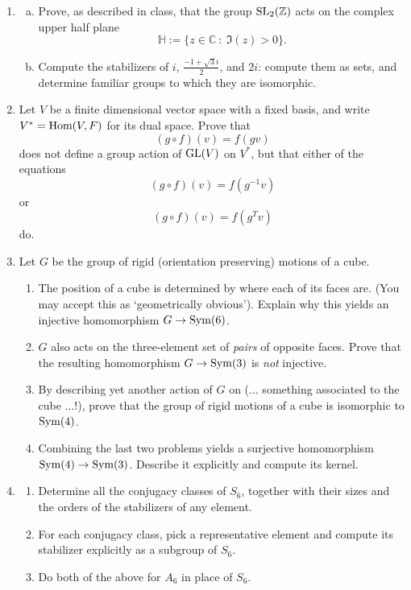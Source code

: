 \documentclass[12pt]{article}
\begin{document}
\begin{enumerate}

\item
\begin{enumerate}[(a)]
\item
Prove, as described in class, that the group $\textnormal{SL}_2(\mathbb{Z})$ acts on the complex upper half plane
\[
\mathbb{H} := \{ z \in \mathbb{C} \ : \ \Im(z) > 0 \}.
\]
\item
Compute the stabilizers of $i$, $\frac{-1 + \sqrt{3} i}{2}$, and $2i$: compute them as sets, and determine familiar groups to which they
are isomorphic. 
\end{enumerate}

\item
Let $V$ be a finite dimensional vector space with a fixed basis, and write $V^* = \textnormal{Hom}(V, F)$ for its dual space.
Prove that 
\[
(g \circ f) (v) = f (gv)
\]
does not define a group action of $\textnormal{GL}(V)$ on $V^*$, but that either of the equations
\[
(g \circ f) (v) = f (g^{-1}v)
\]
or
\[
(g \circ f) (v) = f (g^Tv)
\]
do.

\item 
Let $G$ be the group of rigid (orientation preserving) motions of a cube.
\begin{enumerate}
\item
The position of a cube is determined by where each of its faces are. (You may accept this as `geometrically obvious').
Explain why this yields an injective homomorphism $G \rightarrow \operatorname{Sym}(6)$.

\item
$G$ also acts on the three-element set of {\itshape pairs} of opposite faces. Prove that the resulting homomorphism
$G \rightarrow \operatorname{Sym}(3)$ is {\itshape not} injective.

\item By describing yet another action of $G$ on (... something associated to the cube ...!),
prove that the group of rigid motions of a cube is isomorphic to $\operatorname{Sym}(4)$. 

\item Combining the last two problems yields a surjective homomorphism $\operatorname{Sym}(4) \rightarrow \operatorname{Sym}(3)$. Describe it explicitly and 
compute its kernel.

\end{enumerate}
\item
\begin{enumerate}
\item
Determine all the conjugacy classes of $S_6$, together with their sizes and the orders of the
stabilizers of any element.
\item
For each conjugacy class, pick a representative element and compute its stabilizer explicitly as a subgroup of $S_6$.
\item
Do both of the above for $A_6$ in place of $S_6$.
\end{enumerate}


\end{enumerate}
\end{document}
